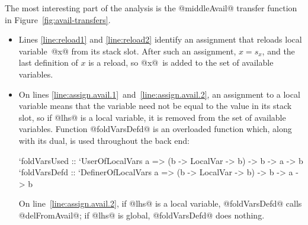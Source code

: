 \documentclass[blockstyle,preprint,natbib,nocopyrightspace]{sigplanconf}
\newcommand\lineref[1]{line~\ref{line:#1}}
\newcommand\linepairref[2]{lines \ref{line:#1}~and~\ref{line:#2}}
\newcommand\slotof[1]{\ensuremath{s_{#1}}}
\def\finalremark#1{\relax}
\newcommand\figref[1]{Figure~\ref{fig:#1}}
\begin{document}
The most interesting part of the analysis is the @middleAvail@ transfer
function in \figref{avail-transfers}.\finalremark
{Let us revise the paper to pretend that global variables
don't exist.}
\begin{itemize}
\item
Lines \ref{line:reload1} and \ref{line:reload2}
identify an assignment that reloads local
variable~@x@ from its stack slot.\finalremark{I propose the compiler be
modified to use @isStackSlotOf@ as I've written. JD~approves.}
After such an assignment, $x = \slotof x$,
and the last definition of $x$ is a reload,
so @x@~is added to the set of available variables.
\item
On \linepairref{assign.avail.1}{assign.avail.2},
an assignment to a local variable means that the
variable need not be equal to the value in its stack
slot, so if @lhs@ is a local variable, it is removed from the set of
available variables.
Function @foldVarsDefd@ is an overloaded function which, along with its dual,
is used throughout the back end:
\begin{code}
`foldVarsUsed :: `UserOfLocalVars a 
        => (b -> LocalVar -> b) -> b -> a -> b
`foldVarsDefd :: `DefinerOfLocalVars a 
        => (b -> LocalVar -> b) -> b -> a -> b
\end{code}
On \lineref{assign.avail.2},  if @lhs@ is a local variable,
@foldVarsDefd@ calls @delFromAvail@;
 if @lhs@ is global, @foldVarsDefd@ does nothing.




\end{itemize}
\end{document}
